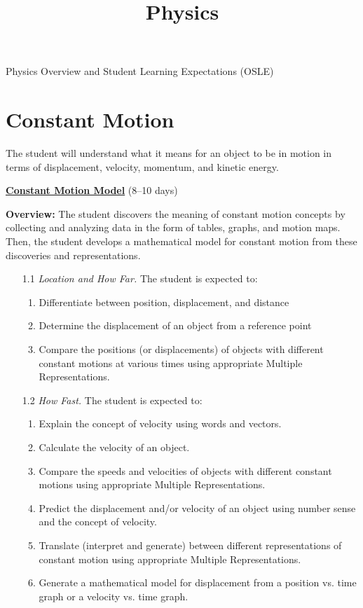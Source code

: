 \documentclass[dvipsnames]{article}
\title{Physics}
\author{}
\date{}
\begin{document}
\vspace{-1em}
\begin{center}
    Physics Overview and Student Learning Expectations (OSLE)
\end{center}

\section{Constant Motion}

\vspace{-3pt}
The student will understand what it means for an object to be in motion in terms of displacement, velocity, momentum, and kinetic energy.
\vspace{3pt}

\textbf{\underline{Constant Motion Model}} (8--10 days)

\textbf{Overview:} The student discovers the meaning of constant motion concepts by collecting and analyzing data in the form of tables, graphs, and motion maps. Then, the student develops a mathematical model for constant motion from these discoveries and representations.

\begin{enumerate}[itemsep=0pt]
    \item[1.1] \textit{Location and How Far.} The student is expected to:
    \begin{enumerate}[itemsep=0pt,topsep=0pt]
        \item Differentiate between position, displacement, and distance
        \item Determine the displacement of an object from a reference point
        \item Compare the positions (or displacements) of objects with different constant motions at various times using appropriate Multiple Representations.
    \end{enumerate}
    \item[1.2] \textit{How Fast.} The student is expected to:
    \begin{enumerate}[itemsep=0pt,topsep=0pt]
        \item Explain the concept of velocity using words and vectors.
        \item Calculate the velocity of an object.
        \item Compare the speeds and velocities of objects with different constant motions using appropriate Multiple Representations.
        \item Predict the displacement and/or velocity of an object using number sense and the concept of velocity.
        \item Translate (interpret and generate) between different representations of constant motion using appropriate Multiple Representations.
        \item Generate a mathematical model for displacement from a position vs. time graph or a velocity vs. time graph.
    \end{enumerate}
\end{enumerate}
\end{document}

